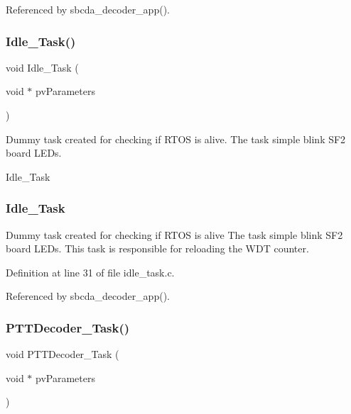 Referenced by sbcda\+\_\+decoder\+\_\+app().

\mbox{\label{group___app___tasks_ga85a0f311d8c7082245c3308cd9161e46}} 
\subsubsection{\texorpdfstring{Idle\+\_\+\+Task()}{Idle\_Task()}}
{\footnotesize\ttfamily void Idle\+\_\+\+Task (\begin{DoxyParamCaption}\item[{void $\ast$}]{pv\+Parameters }\end{DoxyParamCaption})}



Dummy task created for checking if R\+T\+OS is alive. The task simple blink S\+F2 board L\+E\+Ds. 

Idle\+\_\+\+Task



 \subsubsection*{Idle\+\_\+\+Task }

\begin{DoxyVerb}Dummy task created for checking if RTOS is alive
The task simple blink SF2 board LEDs.
This task is responsible for reloading the WDT
counter.\end{DoxyVerb}
 

Definition at line 31 of file idle\+\_\+task.\+c.



Referenced by sbcda\+\_\+decoder\+\_\+app().

\mbox{\label{group___app___tasks_gadfbb515047e6c4c679611a5cc618b88c}} 
\subsubsection{\texorpdfstring{P\+T\+T\+Decoder\+\_\+\+Task()}{PTTDecoder\_Task()}}
{\footnotesize\ttfamily void P\+T\+T\+Decoder\+\_\+\+Task (\begin{DoxyParamCaption}\item[{void $\ast$}]{pv\+Parameters }\end{DoxyParamCaption})}

